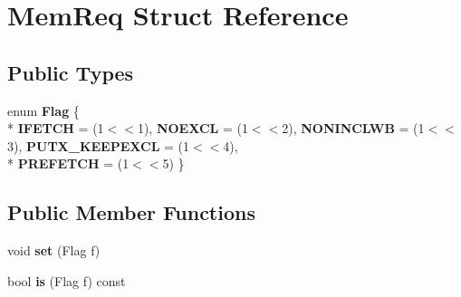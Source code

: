 \hypertarget{structMemReq}{\section{Mem\-Req Struct Reference}
\label{structMemReq}
}
\subsection*{Public Types}
\begin{DoxyCompactItemize}
\item 
enum {\bfseries Flag} \{ \\*
{\bfseries I\-F\-E\-T\-C\-H} = (1$<$$<$1), 
{\bfseries N\-O\-E\-X\-C\-L} = (1$<$$<$2), 
{\bfseries N\-O\-N\-I\-N\-C\-L\-W\-B} = (1$<$$<$3), 
{\bfseries P\-U\-T\-X\-\_\-\-K\-E\-E\-P\-E\-X\-C\-L} = (1$<$$<$4), 
\\*
{\bfseries P\-R\-E\-F\-E\-T\-C\-H} = (1$<$$<$5)
 \}
\end{DoxyCompactItemize}
\subsection*{Public Member Functions}
\begin{DoxyCompactItemize}
\item 
\hypertarget{structMemReq_a6abc9d7241b7121769a0c71dd93a2a5d}{void {\bfseries set} (Flag f)}\label{structMemReq_a6abc9d7241b7121769a0c71dd93a2a5d}

\item 
\hypertarget{structMemReq_a89e64e069e7f28fe1c705636286a1efc}{bool {\bfseries is} (Flag f) const }\label{structMemReq_a89e64e069e7f28fe1c705636286a1efc}

\end{DoxyCompactItemize}
